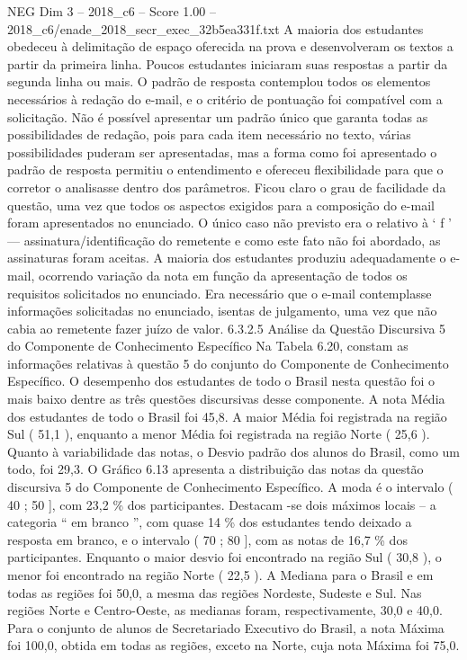 \begin{textsample}{NEG Dim 3 – 2018\_c6 – Score 1.00 – 2018\_c6/enade\_2018\_secr\_exec\_32b5ea331f.txt}
A maioria dos estudantes obedeceu à delimitação de espaço oferecida na prova e desenvolveram os textos a partir da primeira linha.
Poucos estudantes iniciaram suas respostas a partir da segunda linha ou mais.
O padrão de resposta contemplou todos os elementos necessários à redação do e-mail, e o critério de pontuação foi compatível com a solicitação.
Não é possível apresentar um padrão único que garanta todas as possibilidades de redação, pois para cada item necessário no texto, várias possibilidades puderam ser apresentadas, mas a forma como foi apresentado o padrão de resposta permitiu o entendimento e ofereceu flexibilidade para que o corretor o analisasse dentro dos parâmetros.
Ficou claro o grau de facilidade da questão, uma vez que todos os aspectos exigidos para a composição do e-mail foram apresentados no enunciado.
O único caso não previsto era o relativo à ‘ f ’ — assinatura/identificação do remetente e como este fato não foi abordado, as assinaturas foram aceitas.
A maioria dos estudantes produziu adequadamente o e-mail, ocorrendo variação da nota em função da apresentação de todos os requisitos solicitados no enunciado.
Era necessário que o e-mail contemplasse informações solicitadas no enunciado, isentas de julgamento, uma vez que não cabia ao remetente fazer juízo de valor. 6.3.2.5 Análise da Questão Discursiva 5 do Componente de Conhecimento Específico Na Tabela 6.20, constam as informações relativas à questão 5 do conjunto do Componente de Conhecimento Específico.
O desempenho dos estudantes de todo o Brasil nesta questão foi o mais baixo dentre as três questões discursivas desse componente.
A nota Média dos estudantes de todo o Brasil foi 45,8.
A maior Média foi registrada na região Sul ( 51,1 ), enquanto a menor Média foi registrada na região Norte ( 25,6 ).
Quanto à variabilidade das notas, o Desvio padrão dos alunos do Brasil, como um todo, foi 29,3.
O Gráfico 6.13 apresenta a distribuição das notas da questão discursiva 5 do Componente de Conhecimento Específico.
A moda é o intervalo ( 40 ; 50 ], com 23,2 \% dos participantes.
Destacam -se dois máximos locais – a categoria “ em branco ”, com quase 14 \% dos estudantes tendo deixado a resposta em branco, e o intervalo ( 70 ; 80 ], com as notas de 16,7 \% dos participantes.
Enquanto o maior desvio foi encontrado na região Sul ( 30,8 ), o menor foi encontrado na região Norte ( 22,5 ).
A Mediana para o Brasil e em todas as regiões foi 50,0, a mesma das regiões Nordeste, Sudeste e Sul.
Nas regiões Norte e Centro-Oeste, as medianas foram, respectivamente, 30,0 e 40,0.
Para o conjunto de alunos de Secretariado Executivo do Brasil, a nota Máxima foi 100,0, obtida em todas as regiões, exceto na Norte, cuja nota Máxima foi 75,0.

\end{textsample}

